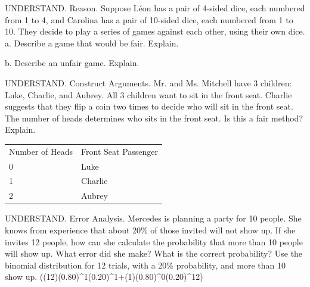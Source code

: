 \documentclass{article}
\newenvironment{practice}[2]{}{}        %
\newcommand{\answer}[1]{}               %
\newcommand{\placeholder}[2]{}          %
\newcommand{\te}[1]{}                   %
\begin{document}
\begin{practice}{11}{2}
UNDERSTAND. Reason. Suppose Léon has a pair of 4-sided dice, each numbered from 1 to 4, and Carolina has a pair of 10-sided dice, each numbered from 1 to 10. They decide to play a series of games against each other, using their own dice.
a. Describe a game that would be fair. Explain.
\answer{Answers may vary. Sample: a. Roll your dice. If the product is even you get one point, if the product is odd you lose two points. This game is fair because the expected value for each player is 0.25.}
b. Describe an unfair game. Explain.
\answer{b. Roll your dice. If the sum is prime number you get two points, if the sum is composite you lose one point. This game is unfair because Léon's expected value is 0.6875, while Carolina's expected value is 0.11.}
\placeholder{photo}{Assorted colored polyhedral numbered dice, including red tetrahedron and green and yellow cubes, with blue, purple, green, orange and black dice of other face counts.}
\end{practice}
\begin{practice}{12}{2}
UNDERSTAND. Construct Arguments. Mr. and Ms. Mitchell have 3 children: Luke, Charlie, and Aubrey. All 3 children want to sit in the front seat. Charlie suggests that they flip a coin two times to decide who will sit in the front seat. The number of heads determines who sits in the front seat. Is this a fair method? Explain.
\begin{tabular}{ll}
Number of Heads & Front Seat Passenger \\
0 & Luke \\
1 & Charlie \\
2 & Aubrey \\
\end{tabular}
\answer{No; there are 2 ways to get 1 head since the sample space is \{HH, HT, TH, TT\}.}
\end{practice}
\begin{practice}{13}{3}
UNDERSTAND. Error Analysis. Mercedes is planning a party for 10 people. She knows from experience that about 20\% of those invited will not show up. If she invites 12 people, how can she calculate the probability that more than 10 people will show up. What error did she make? What is the correct probability?
Use the binomial distribution for 12 trials, with a 20\% probability, and more than 10 show up.
((12)(0.80)^1(0.20)^1+(1)(0.80)^0(0.20)^{12})
\te{Student work note marked with red X.}
\answer{The error is in the exponents for the probability terms. The correct formula is ((12)(0.80)^{11}(0.20)^1+(1)(0.80)^{12}(0.20)^0). The correct probability is 27\%.}
\end{practice}
\end{document}
